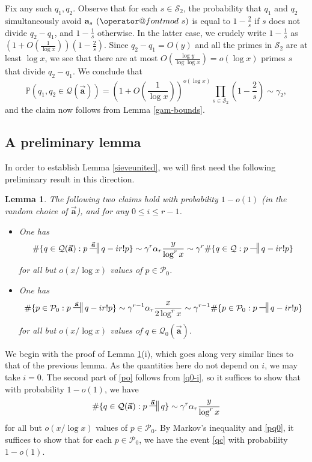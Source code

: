 \documentclass[12pt]{amsart}
\makeatletter
\numberwithin{equation}{section}  %
\theoremstyle{remark}
\theoremstyle{plain}
\newtheorem{lem}{Lemma}[section]
\numberwithin{equation}{section}
\newcommand{\PR}{\mathbb{P}}  %
\renewcommand{\pmod}[1]{\allowbreak\mkern7mu({\operator@font mod}\,\,#1)}
\renewcommand{\leq}{\leqslant}
\renewcommand{\(}{\left(}
\renewcommand{\)}{\right)}
\newcommand{\pfrac}[2]{\left(\frac{#1}{#2}\right)}  %
\newcommand{\asym}{\sim}   %
\newcommand{\relr}{\nsdtstile{}{}} %
\newcommand{\relra}{\nsdtstile{}{\vect{\mathbf{a}}}} %
\newcommand{\vect}[1]{{\ensuremath{\vec{#1}}}}
\newcommand{\PP}{\mathcal{P}}
\newcommand{\QQ}{\mathcal{Q}}
\newcommand{\cS}{\mathcal{S}}
\makeatother
\begin{document}
Fix any such $q_1,q_2$.  Observe that for each $s \in \cS_2$, the probability that $q_1$ and $q_2$ simultaneously avoid $\mathbf{a}_s \pmod{s}$ is equal to $1-\frac{2}{s}$ if $s$ does not divide $q_2-q_1$, and $1-\frac{1}{s}$ otherwise.  In the latter case, we crudely write $1-\frac{1}{s}$ as $(1 + O(\frac{1}{\log x})) (1-\frac{2}{s})$.  Since $q_2-q_1 = O(y)$ and all the primes in $\cS_2$ are at least $\log x$, we see that there are at most $O(\frac{\log y}{\log \log x}) = o(\log x)$ primes $s$ that divide $q_2-q_1$.  We conclude that
$$ \PR( q_1,q_2 \in \QQ(\vect{\mathbf{a}}) ) = \left(1 +
O\pfrac{1}{\log x}\right)^{o(\log x)} \prod_{s \in \cS_2}
\left(1-\frac{2}{s}\right) \asym \gamma_2,$$
and the claim now follows from Lemma \ref{gam-bounds}.

\subsection{A preliminary lemma}

In order to establish Lemma \ref{sieveunited}, we will first need the following preliminary result in this direction.

\begin{lem}\label{QQ1p-normal}  The following two claims hold with probability $1-o(1)$ (in the random choice of $\vect{\mathbf{a}}$), and for any $0 \leq i \leq r-1$.
\begin{itemize}
\item[(i)]  One has
\begin{equation}\label{po}
\# \{ q \in \QQ(\vect{\mathbf{a}}): p \relra q - ir! p \} \asym \gamma^r \alpha_r \frac{y}{\log^r x} \asym \gamma^r \# \{ q \in \QQ: p \relr q-ir! p \}
\end{equation}
for all but $o(x/\log x)$ values of $p \in \PP_0$.
\item[(ii)] One has
\begin{equation}\label{qo}
 \# \{ p \in \PP_0: p \relra q - ir! p \} \asym \gamma^{r-1} \alpha_r \frac{x}{2\log^r x} \asym \gamma^{r-1} \# \{ p \in \PP_0: p \relr q-ir! p \}
\end{equation}
for all but $o(x/\log x)$ values of $q \in \QQ_0(\vect{\mathbf{a}})$.
\end{itemize}
\end{lem}

We begin with the proof of Lemma \ref{QQ1p-normal}(i), which goes along very similar lines to that of the previous lemma.  As the quantities here do not depend on $i$, we may take $i=0$.  The second part of \eqref{po} follows from \eqref{q0-i}, so it suffices to show that with probability $1-o(1)$, we have
\begin{equation}\label{qc}
\# \{ q \in \QQ(\vect{\mathbf{a}}): p \relra q \} \asym \gamma^r \alpha_r \frac{y}{\log^r x}
\end{equation}
for all but $o(x/\log x)$ values of $p \in \PP_0$.  By Markov's inequality and \eqref{pq0}, it suffices to show that for each $p \in \PP_0$, we have the event \eqref{qc} with probability $1-o(1)$. 
\end{document}
